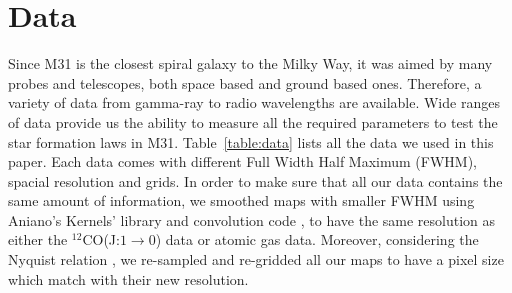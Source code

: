 \documentclass[useAMS,usenatbib]{mn2e}
\begin{document}
\section{Data}
\label{sec:data}
Since M31 is the closest spiral galaxy to the Milky Way, it was aimed by many probes and telescopes, both space based and ground based ones. Therefore, a variety of data from gamma-ray to radio wavelengths are available. Wide ranges of data provide us the ability to measure all the required parameters to test the star formation laws in M31. Table~\ref{table:data} lists all the data we used in this paper. Each data comes with different Full Width Half Maximum (FWHM), spacial resolution and grids. In order to make sure that all our data contains the same amount of information, we smoothed maps with smaller FWHM using Aniano's Kernels' library and convolution code \citep{Aniano12}, to have the same resolution as either the $^{12}$CO(J:$1\rightarrow0$) data or atomic gas data. Moreover, considering the Nyquist relation \citep{Nyquist}, we re-sampled and re-gridded all our maps to have a pixel size which match with their new resolution. %
\end{document}
